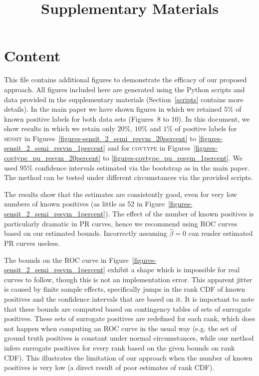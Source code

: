 \documentclass{article}
\title{Supplementary Materials}
\date{}
\newcommand{\covtype}{\textsc{covtype}\xspace}
\newcommand{\sensit}{\textsc{sensit}\xspace}
\begin{document}
 

\maketitle

\section{Content}
This file contains additional figures to demonstrate the efficacy of our proposed approach. All figures included here are generated using the Python scripts and data provided in the supplementary materials (Section~\ref{scripts} contains more details). In the main paper we have shown figures in which we retained $5\%$ of known positive labels for both data sets (Figures~8 to 10). In this document, we show results in which we retain only $20\%$, $10\%$ and $1\%$ of positive labels for \sensit in Figures~\ref{figures-sensit_2_semi_resvm_20percent} to \ref{figures-sensit_2_semi_resvm_1percent} and for \covtype in Figures~\ref{figures-covtype_pu_resvm_20percent} to \ref{figures-covtype_pu_resvm_1percent}. We used $95\%$ confidence intervals estimated via the bootstrap as in the main paper. The method can be tested under different circumstances via the provided scripts.

The results show that the estimates are consistently good, even for very low numbers of known positives (as little as 52 in Figure~\ref{figures-sensit_2_semi_resvm_1percent}). The effect of the number of known positives is particularly dramatic in PR curves, hence we recommend using ROC curves based on our estimated bounds. Incorrectly assuming $\hat{\beta}=0$ can render estimated PR curves useless.

The bounds on the ROC curve in Figure~\ref{figures-sensit_2_semi_resvm_1percent} exhibit a shape which is impossible for real curves to follow, though this is not an implementation error. This apparent jitter is caused by finite sample effects, specifically jumps in the rank CDF of known positives and the confidence intervals that are based on it. It is important to note that these bounds are computed based on contingency tables of sets of surrogate positives. These sets of surrogate positives are redefined for each rank, which does not happen when computing an ROC curve in the usual way (e.g. the set of ground truth positives is constant under normal circumstances, while our method infers surrogate positives for every rank based on the given bounds on rank CDF). This illustrates the limitation of our approach when the number of known positives is very low (a direct result of poor estimates of rank CDF).
\end{document}
